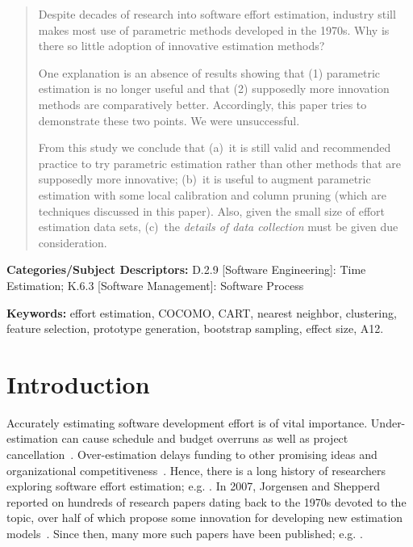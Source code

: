 \documentclass{sig-alternate}
\begin{document}
\begin{abstract}
Despite decades of research into software effort estimation,
 industry  still makes most use of 
parametric methods  developed in the 1970s.
Why is there so little adoption of   innovative  estimation methods?

One explanation is an absence of results showing that
(1) parametric estimation is no longer useful and that
(2) supposedly more innovation methods 
are comparatively better. 
Accordingly, this paper tries 
to demonstrate these two points. 
We were unsuccessful.  

From this study we conclude that (a)~it is still valid and recommended practice to try parametric estimation
rather than other methods that are supposedly more  innovative;
(b)~it is useful
to augment parametric estimation with some local calibration 
and column pruning (which are techniques  discussed in this paper).
Also, given the small size of effort estimation data sets,
(c)~the {\em details of data collection} must be given due consideration.
\end{abstract}


\vspace{1mm}
\noindent
{\bf Categories/Subject Descriptors:} 
D.2.9 [Software Engineering]: Time Estimation;
K.6.3 [Software Management]: Software Process

\vspace{1mm}
\noindent
{\bf Keywords:} effort estimation, COCOMO, CART, nearest neighbor, 
clustering, feature selection, prototype generation, bootstrap sampling, effect size, A12.
 

\section{Introduction}
Accurately estimating software development
effort  is of vital
importance. 
Under-estimation can cause schedule and budget
overruns as well as project
cancellation~\cite{CLCS03}.  Over-estimation delays
funding to other promising ideas and
organizational competitiveness~\cite{koc11a}.
Hence, there is a long history
of researchers exploring software effort estimation; e.g. \cite{wol74,frei79,putnam76,black77,herd77,watson77,jensen83,park88,boehm81,Walkerden1999,shepperd97,jorgensen05,me06d,burgess01}.
In 2007, Jorgensen and Shepperd
reported on hundreds of research papers dating back to the 1970s devoted to
the topic, over half of which propose some innovation
for developing new estimation
models~\cite{jorgensen05}. Since then,
many more such papers have been published;
e.g. \cite{lokan06,cora10,minku14,Li2007,Li2009a,keung2008a,keung2008b,keung2008c,koc11b,me12a,me13a,kocaguneli2014transfer}.
\end{document}
